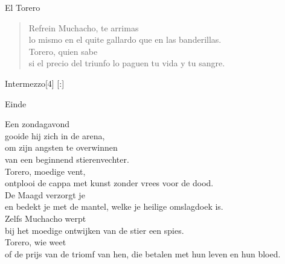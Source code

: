 \begin{song}{El Torero}
\begin{verse}{Refrein}
Muchacho, te arrimas\\
lo mismo en el quite gallardo que en las banderillas.\\
Torero,  quien sabe \\
si el precio del triunfo lo paguen tu vida y tu sangre.
\end{verse}

\begin{instrumental}{Intermezzo}[4]
   [:]
 
\end{instrumental}



\begin{instrumental}{Einde}
 
\end{instrumental}
\end{song}

\begin{translation}
Een zondagavond\\
gooide hij zich in de arena,\\
om zijn angsten te overwinnen\\
van een beginnend stierenvechter.\\

Torero, moedige vent,\\
ontplooi de cappa met kunst zonder vrees voor de dood.\\
De Maagd verzorgt je\\
en bedekt je met de mantel, welke je heilige omslagdoek is.\\

Zelfs Muchacho werpt\\
bij het moedige ontwijken van de stier een spies.\\
Torero, wie weet\\
of de prijs van de triomf van hen, die betalen met hun leven en hun
bloed.
\end{translation}

